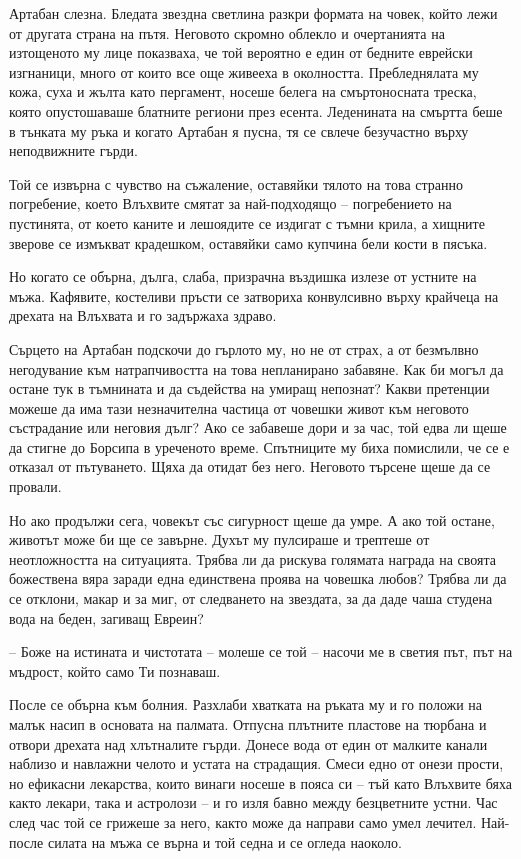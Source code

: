 Артабан слезна. Бледата звездна светлина разкри формата на човек, който лежи от
другата страна на пътя. Неговото скромно облекло и очертанията на изтощеното му
лице показваха, че той вероятно е един от бедните еврейски изгнаници, много от
които все още живееха в околността. Пребледнялата му кожа, суха и жълта като
пергамент, носеше белега на смъртоносната треска, която опустошаваше блатните
региони през есента. Леденината на смъртта беше в тънката му ръка и когато
Артабан я пусна, тя се свлече безучастно върху неподвижните гърди.

Той се извърна с чувство на съжаление, оставяйки тялото на това странно
погребение, което Влъхвите смятат за най-подходящо -- погребението на пустинята,
от което каните и лешоядите се издигат с тъмни крила, а хищните зверове се
измъкват крадешком, оставяйки само купчина бели кости в пясъка.

Но когато се обърна, дълга, слаба, призрачна въздишка излезе от устните на мъжа.
Кафявите, костеливи пръсти се затвориха конвулсивно върху крайчеца на дрехата на
Влъхвата и го задържаха здраво.

Сърцето на Артабан подскочи до гърлото му, но не от страх, а от безмълвно
негодувание към натрапчивостта на това непланирано забавяне. Как би могъл да
остане тук в тъмнината и да съдейства на умиращ непознат? Какви претенции можеше
да има тази незначителна частица от човешки живот към неговото състрадание или
неговия дълг? Ако се забавеше дори и за час, той едва ли щеше да стигне до
Борсипа в уреченото време. Спътниците му биха помислили, че се е отказал от
пътуването. Щяха да отидат без него. Неговото търсене щеше да се провали.

Но ако продължи сега, човекът със сигурност щеше да умре. А ако той остане,
животът може би ще се завърне. Духът му пулсираше и трептеше от неотложността на
ситуацията. Трябва ли да рискува голямата награда на своята божествена вяра
заради една единствена проява на човешка любов? Трябва ли да се отклони, макар и
за миг, от следването на звездата, за да даде чаша студена вода на беден,
загиващ Евреин?

-- Боже на истината и чистотата -- молеше се той -- насочи ме в светия път, път
на мъдрост, който само Ти познаваш.

После се обърна към болния. Разхлаби хватката на ръката му и го положи на малък
насип в основата на палмата. Отпусна плътните пластове на тюрбана и отвори
дрехата над хлътналите гърди. Донесе вода от един от малките канали наблизо и
навлажни челото и устата на страдащия. Смеси едно от онези прости, но ефикасни
лекарства, които винаги носеше в пояса си -- тъй като Влъхвите бяха както
лекари, така и астролози -- и го изля бавно между безцветните устни. Час след
час той се грижеше за него, както може да направи само умел лечител. Най-после
силата на мъжа се върна и той седна и се огледа наоколо.

